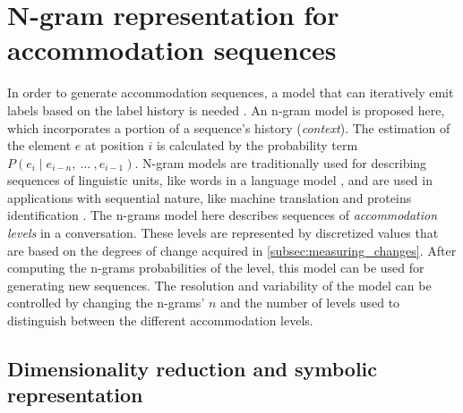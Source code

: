 \section{N-gram representation for accommodation sequences}
\label{sec:accommodation_as_a_lm}

In order to generate accommodation sequences, a model that can iteratively emit labels based on the label history is needed \citep[in contrast to, e.g., models with the Markov property, as in][]{Bellman1957markovian}.
An n-gram model is proposed here, which incorporates a portion of a sequence's history (\emph{context}).
The estimation of the element $e$ at position $i$ is calculated by the probability term $P(e_i \mid e_{i-n},\ \ldots\ , e_{i-1})$.
N-gram models are traditionally used for describing sequences of linguistic units, like words in a language model \citep[e.g.,][]{Niesler1996variable}, and are used in applications with sequential nature, like machine translation \citep{Marino2006ngram} and proteins identification \citep{Xu2015identification}.
The n-grams model here describes sequences of \emph{accommodation levels} in a conversation.
These levels are represented by discretized values that are based on the degrees of change acquired in \cref{subsec:measuring_changes}.
After computing the n-grams probabilities of the level, this model can be used for generating new sequences.
The resolution and variability of the model can be controlled by changing the n-grams' $n$ and the number of levels used to distinguish between the different accommodation levels.

\subsection{Dimensionality reduction and symbolic representation}
\label{subsec:dim_reduction_and_symbolic_rep}

